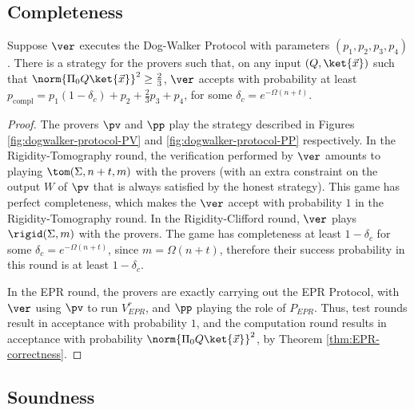 \subsection{Completeness}

\begin{lemma}\label{lem:dogwalker-completeness}
Suppose $\ver$ executes the Dog-Walker Protocol with parameters $(p_1,p_2,p_3,p_4)$.
There is a strategy for the provers such that, on any input $(Q,\ket{\vec{x}})$
  such that $\norm{\Pi_0 Q\ket{\vec{x}}}^2\geq \frac{2}{3}$, $\ver$ accepts with
  probability at least
  $p_{\mathrm{compl}}=p_1(1-\delta_c)+p_2+\frac{2}{3}p_3+p_4$, for some $\delta_c = e^{-\Omega(n+t)}$.
\end{lemma}

\begin{proof}
The provers $\pv$ and $\pp$ play the strategy described in Figures
  \ref{fig:dogwalker-protocol-PV} and \ref{fig:dogwalker-protocol-PP}
  respectively. In the Rigidity-Tomography round, the verification performed by
  $\ver$ amounts to playing $\tom(\Sigma,n+t,m)$ with the provers (with an extra
  constraint on the output $W$ of $\pv$ that is always satisfied by the honest
  strategy). This game has perfect
  completeness, which makes the $\ver$
  accept with probability $1$ in the Rigidity-Tomography round.
  In the Rigidity-Clifford round, $\ver$ plays $\rigid(\Sigma,m)$
  with the provers. The game
  has completeness at least $1-\delta_c$ for some $\delta_c=e^{-\Omega(n+t)}$,
  since $m=\Omega(n+t)$, therefore their success probability in this round is
  at least $1-\delta_c$.

In the EPR round, the provers are exactly carrying out the EPR Protocol, with $\ver$ using $\pv$ to run $V_{EPR}^r$, and $\pp$ playing the role of $P_{EPR}$. Thus, test rounds result in acceptance with probability $1$, and the computation round results in acceptance with probability $\norm{\Pi_0 Q\ket{\vec{x}}}^2$, by Theorem \ref{thm:EPR-correctness}. 
\end{proof}


\subsection{Soundness}

